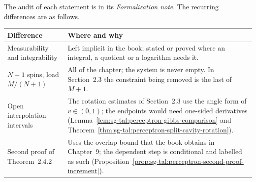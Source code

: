 \begin{remark}\label{rem:sg-tal:perceptron-chapter2-hypotheses}
The audit of each statement is in its \emph{Formalization note}. The recurring differences are as follows.
\begin{center}
\begin{tabular}{|p{}|p{}|}
\hline
\textbf{Difference} & \textbf{Where and why} \\
\hline
Measurability and integrability & Left implicit in the book; stated or proved where an integral, a quotient or a
logarithm needs it. \\
\hline
$N+1$ spins, load $M/(N+1)$ & All of the chapter; the system is never empty. In Section~2.3 the constraint being
removed is the last of $M+1$. \\
\hline
Open interpolation intervals & The rotation estimates of Section~2.3 use the angle form of $v\in(0,1)$; the
endpoints would need one-sided derivatives (Lemma~\ref{lem:sg-tal:perceptron-gibbs-comparison} and
Theorem~\ref{thm:sg-tal:perceptron-split-cavity-rotation}). \\
\hline
Second proof of Theorem~2.4.2 & Uses the overlap bound that the book obtains in Chapter~9; the dependent step is
conditional and labelled as such
(Proposition~\ref{prop:sg-tal:perceptron-second-proof-increment}). \\
\hline
\end{tabular}
\end{center}
\end{remark}

